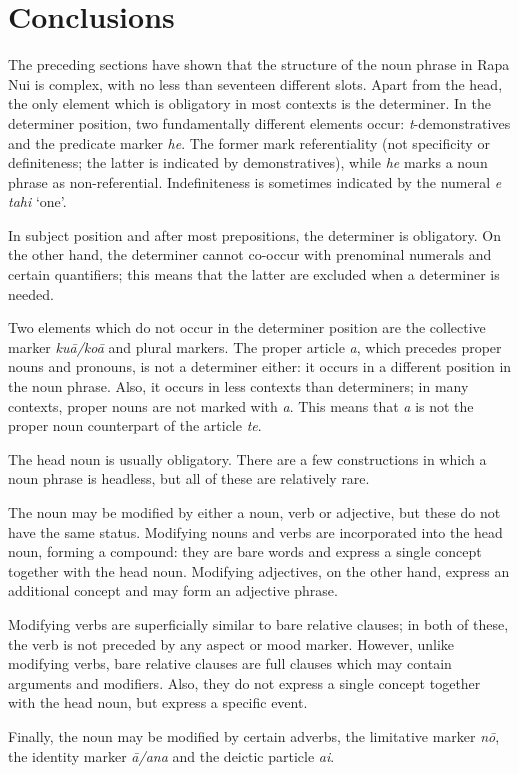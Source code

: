 \section{Conclusions}\label{sec:5.14}

The preceding sections have shown that the structure of the noun phrase in Rapa Nui is complex, with no less than seventeen different slots. Apart from the head, the only element which is obligatory in most contexts is the determiner. In the determiner position, two fundamentally different elements occur: \textit{t}{}-demonstratives and the predicate marker \textit{he}. The former mark referentiality (not specificity or definiteness; the latter is indicated by demonstratives), while \textit{he} marks a noun phrase as non-referential. Indefiniteness is sometimes indicated by the numeral \textit{e tahi} ‘one’.

In subject position and after most prepositions, the determiner is obligatory. On the other hand, the determiner cannot co-occur with prenominal numerals and certain quantifiers; this means that the latter are excluded when a determiner is needed. 

Two elements which do not occur in the determiner position are the collective marker \textit{kuā/koā} and plural markers. The proper article \textit{a}, which precedes proper nouns and pronouns, is not a determiner either: it occurs in a different position in the noun phrase. Also, it occurs in less contexts than determiners; in many contexts, proper nouns are not marked with \textit{a}. This means that \textit{a} is not the proper noun counterpart of the article \textit{te}.

The head noun is usually obligatory. There are a few constructions in which a noun phrase is headless, but all of these are relatively rare.

The noun may be modified by either a noun, verb or adjective, but these do not have the same status. Modifying nouns and verbs are incorporated into the head noun, forming a compound: they are bare words and express a single concept together with the head noun. Modifying adjectives, on the other hand, express an additional concept and may form an adjective phrase.

Modifying verbs are superficially similar to bare relative clauses; in both of these, the verb is not preceded by any aspect or mood marker. However, unlike modifying verbs, bare relative clauses are full clauses which may contain arguments and modifiers. Also, they do not express a single concept together with the head noun, but express a specific event.

Finally, the noun may be modified by certain adverbs, the limitative marker \textit{nō}, the identity marker \textit{{\ꞌ}ā/{\ꞌ}ana} and the deictic particle \textit{ai}.
